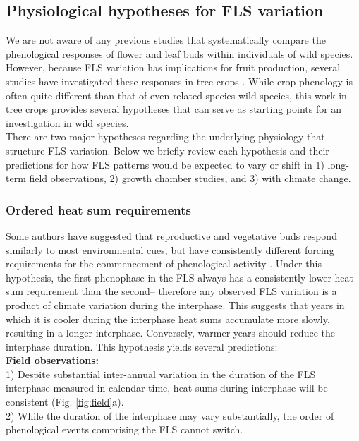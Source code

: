 \documentclass[11pt]{article}
\begin{document}
\subsection*{Physiological hypotheses for FLS variation}
\noindent We are not aware of any previous studies that systematically compare the phenological responses of flower and leaf buds within individuals of wild species. However, because FLS variation has implications for fruit production, several studies have investigated these responses in tree crops \citep[see][]{Guo_2014,Garigalio2016,Citadin2001}. While crop phenology is often quite different than that of even related species wild species, this work in tree crops provides several hypotheses that can serve as starting points for an investigation in wild species.\\

\noindent There are two major hypotheses regarding the underlying physiology that structure FLS variation. Below we briefly review each hypothesis and their predictions for how FLS patterns would be expected to vary or shift in 1) long-term field observations, 2) growth chamber studies, and 3) with climate change.

\subsubsection*{Ordered heat sum requirements}%
\noindent Some authors have suggested that reproductive and vegetative buds respond similarly to most environmental cues, but have consistently different forcing requirements for the commencement of phenological activity \citep{Guo_2014}. Under this hypothesis, the first phenophase in the FLS always has a consistently lower heat sum requirement than the second-- therefore any observed FLS variation is a product of climate variation during the interphase. This suggests that years in which it is cooler during the interphase heat sums accumulate more slowly, resulting in a longer interphase. Conversely, warmer years should reduce the interphase duration. This hypothesis yields several predictions:\\

\noindent \textbf{Field observations:}\\ 1) Despite substantial inter-annual variation in the duration of the FLS interphase measured in calendar time, heat sums during interphase will be consistent (Fig. \ref{fig:field}a).\\ 2) While the duration of the interphase may vary substantially, the order of phenological events comprising the FLS cannot switch. \\
\end{document}

